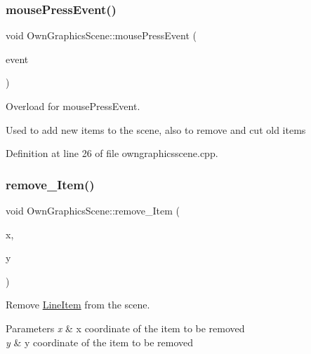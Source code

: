 \mbox{\label{classOwnGraphicsScene_a1a9916971af608d5331483606f72fbe4}} 
\subsubsection{\texorpdfstring{mouse\+Press\+Event()}{mousePressEvent()}}
{\footnotesize\ttfamily void Own\+Graphics\+Scene\+::mouse\+Press\+Event (\begin{DoxyParamCaption}\item[{Q\+Graphics\+Scene\+Mouse\+Event $\ast$}]{event }\end{DoxyParamCaption})}



Overload for mouse\+Press\+Event. 

Used to add new items to the scene, also to remove and cut old items 

Definition at line 26 of file owngraphicsscene.\+cpp.

\mbox{\label{classOwnGraphicsScene_a5b4b466a697f83c23294a80067edac23}} 
\subsubsection{\texorpdfstring{remove\+\_\+\+Item()}{remove\_Item()}}
{\footnotesize\ttfamily void Own\+Graphics\+Scene\+::remove\+\_\+\+Item (\begin{DoxyParamCaption}\item[{unsigned}]{x,  }\item[{unsigned}]{y }\end{DoxyParamCaption})}



Remove \mbox{\hyperlink{classLineItem}{Line\+Item}} from the scene. 


\begin{DoxyParams}{Parameters}
{\em x} & x coordinate of the item to be removed \\
\hline
{\em y} & y coordinate of the item to be removed \\
\hline
\end{DoxyParams}


